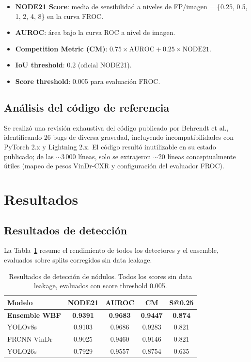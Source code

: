 \documentclass[conference]{IEEEtran}
\begin{document}
\begin{itemize}
    \item \textbf{NODE21 Score}: media de sensibilidad a niveles de FP/imagen = \{0.25, 0.5, 1, 2, 4, 8\} en la curva FROC.
    \item \textbf{AUROC}: área bajo la curva ROC a nivel de imagen.
    \item \textbf{Competition Metric (CM)}: $0.75 \times \text{AUROC} + 0.25 \times \text{NODE21}$.
    \item \textbf{IoU threshold}: 0.2 (oficial NODE21).
    \item \textbf{Score threshold}: 0.005 para evaluación FROC.
\end{itemize}

\subsection{Análisis del código de referencia}

Se realizó una revisión exhaustiva del código publicado por Behrendt et al., identificando 26 bugs de diversa gravedad, incluyendo incompatibilidades con PyTorch 2.x y Lightning 2.x. El código resultó inutilizable en su estado publicado; de las $\sim$3\,000 líneas, solo se extrajeron $\sim$20 líneas conceptualmente útiles (mapeo de pesos VinDr-CXR y configuración del evaluador FROC).

\section{Resultados}
\label{sec:resultados}

\subsection{Resultados de detección}

La Tabla~\ref{tab:deteccion} resume el rendimiento de todos los detectores y el ensemble, evaluados sobre splits corregidos sin data leakage.

\begin{table}[!t]
\centering
\caption{Resultados de detección de nódulos. Todos los scores sin data leakage, evaluados con score threshold 0.005.}
\label{tab:deteccion}
\renewcommand{\arraystretch}{1.15}
\begin{tabular}{lcccc}
\toprule
\textbf{Modelo} & \textbf{NODE21} & \textbf{AUROC} & \textbf{CM} & \textbf{S@0.25} \\
\midrule
\textbf{Ensemble WBF} & \textbf{0.9391} & \textbf{0.9683} & \textbf{0.9447} & \textbf{0.874} \\
YOLOv8s & 0.9103 & 0.9686 & 0.9283 & 0.821 \\
FRCNN VinDr & 0.9025 & 0.9460 & 0.9146 & 0.821 \\
YOLO26s & 0.7929 & 0.9557 & 0.8754 & 0.635 \\
\bottomrule
\end{tabular}
\end{table}
\end{document}

